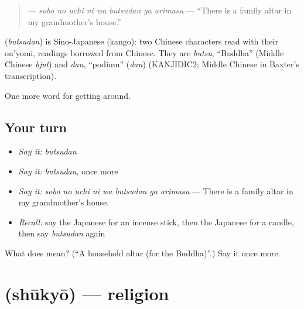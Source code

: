 \begin{quote}
\textbf{   } — \emph{sobo no uchi ni wa butsudan ga arimasu} — \textquotedblleft{}There is a family altar in my grandmother's house.\textquotedblright{}
\end{quote}

\begin{cousinweb}
\textbf{} (\emph{butsudan}) is Sino-Japanese (kango): two Chinese characters read with their on'yomi, readings borrowed from Chinese. They are \emph{butsu}, \textquotedblleft{}Buddha\textquotedblright{} (Middle Chinese \emph{bjut}) and \emph{dan}, \textquotedblleft{}podium\textquotedblright{} (\emph{dan}) (KANJIDIC2; Middle Chinese in Baxter's transcription).
\end{cousinweb}

\begin{grammarlens}[title={What you've built}]
One more word for getting around.
\end{grammarlens}

\subsection*{Your turn}
\begin{itemize}
\raggedright
  \item \emph{Say it:} \emph{butsudan}
  \item \emph{Say it:} \emph{butsudan}, once more
  \item \emph{Say it:} \emph{sobo no uchi ni wa butsudan ga arimasu} — There is a family altar in my grandmother's house.
  \item \emph{Recall:} say the Japanese for an incense stick, then the Japanese for a candle, then say \emph{butsudan} again
\end{itemize}

\begin{tcolorbox}[breakable,colback=teal!4,colframe=teal!35!black,title={Before you move on}]
What does  mean? (\textquotedblleft{}A household altar (for the Buddha)\textquotedblright{}.) Say it once more.
\end{tcolorbox}
\section[\texorpdfstring{\ja{しゅうきょう} (shūkyō)}{しゅうきょう (shūkyō)}]{ (shūkyō) — religion}

\label{lesson:JA-C408-shuukyou}



